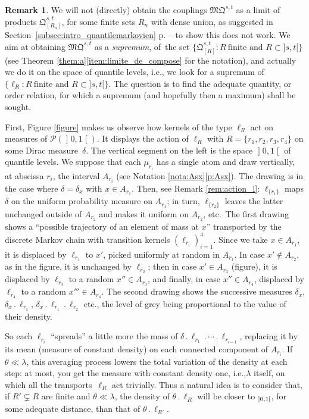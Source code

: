 \documentclass[11pt]{article}
\makeatletter
\newcommand{\ie}{i.e.,\xspace}
\newcommand{\ldot}{\mathbin{.}}
\newcommand{\lcdots}{\ldot\cdots\ldot}
\DeclareRobustCommand{\mathbbm}[1]{\csname jepbb@#1\endcsname}
\theoremstyle{plain}
\theoremstyle{definition}
\newtheorem{rem}[them]{Remark}
\newcommand{\como}{\mathfrak{Q}}
\newcommand{\mq}{\mathfrak{MQ}}
\newcommand{\one}{\mathbbm{1}}
\newcommand{\la}{\lambda}
\newcommand{\p}{\mathcal{P}}
\newcommand{\op}{\mathopen}
\newcommand{\clo}{\mathclose}
\makeatother
\begin{document}
\begin{rem}\label{rem:qualitative}We will not (directly) obtain the couplings $\mq^{s,t}$ as a limit of products $\como^{s,t}_{[R_n]}$, for some finite sets $R_n$ with dense union, as suggested in Section~\ref{subsec:intro_quantilemarkovien} p.\,\pageref{page:tentative_limite}---to show this does not work. We aim at obtaining $\mq^{s,t}$ as a \emph{supremum}, of~the set $\{\como^{s,t}_{[R]} : R\ \text{finite and } R\subset]s,t[\}$ (see Theorem \ref{them:a}\eqref{item:limite_de_compose} for the notation), and actually we do it on the space of quantile levels, \ie we look for a supremum of $\{\ell_R : R\ \text{finite and } R\subset]s,t[\}$. The question is to find the adequate quantity, or order relation, for which a supremum (and hopefully then a maximum) shall be sought.

First, Figure \ref{figure} makes us observe how kernels of the type $\ell_R$ act on measures of $\p(\op]0,1\clo[)$. It displays the action of $\ell_{R}$ with $R=\{r_1,r_2,r_3,r_4\}$ on some Dirac measure~$\delta$. The vertical segment on the left is the space $\op]0,1\clo[$ of quantile levels. We suppose that each $\mu_{r_i}$ has a single atom and draw vertically, at abscissa $r_i$, the interval $A_{r_i}$ (see Notation \ref{nota:Asx}\eqref{p:Asx}). The drawing is in the case where $\delta=\delta_{x}$ with $x\in A_{r_1}$. Then, see Remark \ref{rem:action_l}: $\ell_{\{r_1\}}$ maps $\delta$ on the uniform probability measure on $A_{r_1}$; in turn, $\ell_{\{r_2\}}$ leaves the latter unchanged outside of $A_{r_2}$ and makes it uniform on $A_{r_2}$, etc.\ The first drawing shows a ``possible trajectory of an element of mass at $x$'' transported by the discrete Markov chain with transition kernels $(\ell_{r_i})_{i=1}^4$. Since we take $x \in A_{r_1}$, it is displaced by $\ell_{r_1}$ to $x '$, picked uniformly at random in $A_{r_1}$. In case $x '\not\in A_{r_2}$, as in the figure, it is unchanged by $\ell_{r_2}$; then in case $x '\in A_{r_3}$ (figure), it is displaced by $\ell_{r_3}$ to a random $x ''\in A_{r_3}$, and finally, in case $x ''\in A_{r_4}$, displaced by $\ell_{r_4}$ to a random $x '''\in A_{r_4}$. The second drawing shows the successive measures $\delta_x $, $\delta_x \ldot\ell_{r_1}$, $\delta_x \ldot\ell_{r_1}{}\ldot\ell_{r_2}$ etc., the level of grey being proportional to the value of their density.

So each $\ell_{r_i}$ ``spreads'' a little more the mass of $\delta\ldot\ell_{r_1}\lcdots \ell_{r_{i-1}}$, replacing it by its mean (measure of constant density) on each connected component of $A_{r_i}$. If~$\theta\ll\la$, this averaging process lowers the total variation of the density at each step: at most, you get the measure with constant density one, \ie $\la$ itself, on which all the transports~$\ell_{R}$ act trivially. Thus a natural idea is to consider that, if ${R'}\subsetneq R$ are finite and $\theta\ll\la$, the density of $\theta\ldot \ell_{R}$ will be closer to $\one_{\op]0,1\clo[}$, for some adequate distance, than that of $\theta\ldot \ell_{R'}$.


\end{rem}
\end{document}
